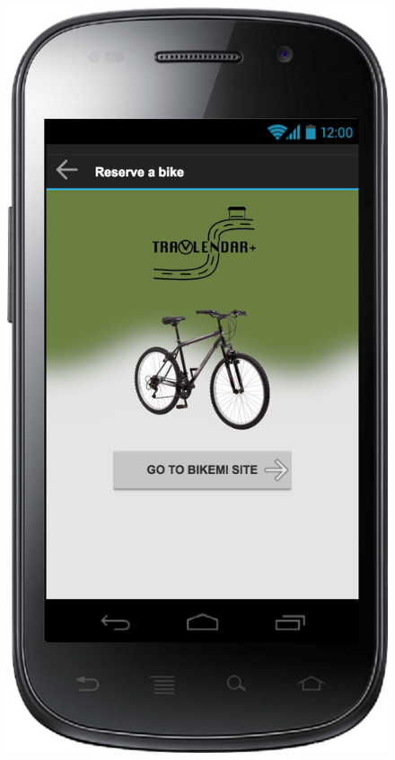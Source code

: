 \documentclass[a4paper,leqno]{article}
\begin{document}
\begin{figure}
	\hspace{0.5cm}
	\begin{minipage}[!h]{0.45\linewidth}
		\centering
		\includegraphics[scale = 0.15]{reserveBike.png}
	\end{minipage}
\end{figure}
\end{document}
